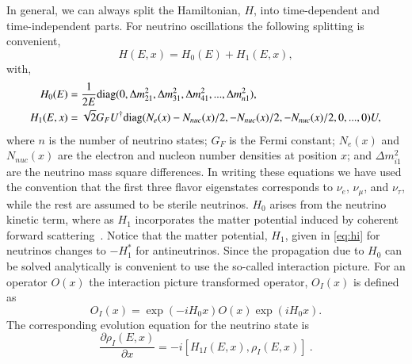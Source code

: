 \documentclass[3p,12pt]{elsarticle}
\newcommand{\pa}[2]{\frac{\partial #1}{\partial #2}}
\begin{document}
In general, we can always split the Hamiltonian, $H$, into
time-dependent and time-independent parts. For neutrino oscillations
the following splitting is convenient,
\begin{equation}
H(E,x) = H_0(E)  + H_{1}(E,x) ,
\end{equation}
with,
\begin{subequations}
\label{eq:hamiltonian}
\begin{align}
H_0 (E) &= \frac{1}{2E} {\rm diag}( 0 , \Delta m^2_{21},\Delta m^2_{31},\Delta m^2_{41},...,\Delta m^2_{n1}) \label{eq:h0} ,\\
H_1 (E,x) &= \sqrt{2} G_F U^\dagger {\rm diag} ( N_e(x) -
N_{nuc}(x)/2, -N_{nuc}(x)/2, -N_{nuc}(x)/2 , 0,...,0 )U ,\label{eq:hi} 
\end{align}
\end{subequations}
where $n$ is the number of neutrino states; $G_F$ is the Fermi
constant; $N_e(x)$ and $N_{nuc}(x)$ are the electron and nucleon number
densities at position $x$; and $\Delta m^2_{i1}$ are the neutrino mass
square differences.
In writing these equations we have used the convention that the first
three flavor eigenstates corresponds to 
$\nu_e$, $\nu_\mu$, and $\nu_\tau$, while the rest are assumed to be
sterile neutrinos. $H_0$ arises from the neutrino kinetic
term, where as $H_1$ incorporates the matter potential induced by coherent
forward scattering~\citep{Mikheev:1986gs,Mikheev:1986wj,Wolfenstein:1977ue}. Notice that the matter
potential, $H_1$, given in \eqref{eq:hi} for neutrinos changes to
$-H_1^*$ for antineutrinos. 
Since the propagation due to $H_0$ can be solved analytically is
convenient to use the  so-called interaction picture. For an operator
$O(x)$ the interaction picture transformed
operator, $O_I(x)$ is defined as
\begin{equation}
O_I(x)=\exp(-iH_0x)O(x)\exp(iH_0x).
\end{equation}
The corresponding evolution equation  for the neutrino state is
\begin{equation}
\pa{\rho_I(E,x)}{x} = -i [ H_{1I} (E,x), \rho_I(E,x) ]~.
\label{eq:schrodinger_int}
\end{equation}
\end{document}
